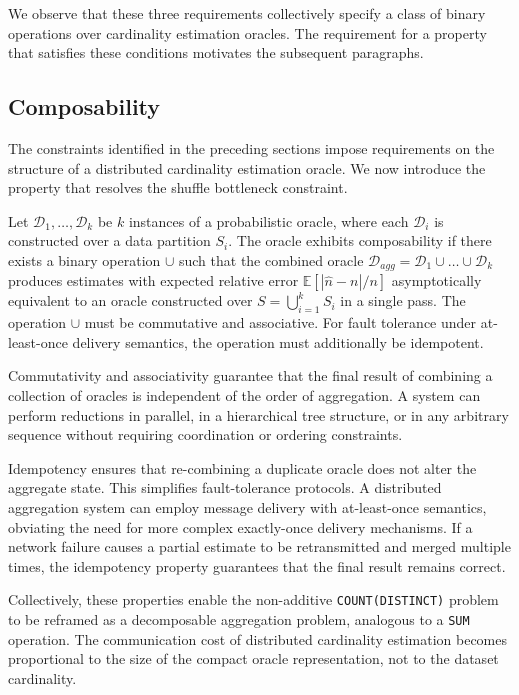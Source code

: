 We observe that these three requirements collectively specify a class of binary operations over cardinality estimation oracles. The requirement for a property that satisfies these conditions motivates the subsequent paragraphs.

\subsection{Composability}

The constraints identified in the preceding sections impose requirements on the structure of a distributed cardinality estimation oracle. We now introduce the property that resolves the shuffle bottleneck constraint.

\begin{definition}[Composability] \label{def:composability}
    Let $\mathcal{D}_1, \dots, \mathcal{D}_k$ be $k$ instances of a probabilistic oracle, where each $\mathcal{D}_i$ is constructed over a data partition $S_i$. The oracle exhibits composability if there exists a binary operation $\cup$ such that the combined oracle $\mathcal{D}_{agg} = \mathcal{D}_1 \cup \dots \cup \mathcal{D}_k$ produces estimates with expected relative error $\mathbb{E}[|\hat{n} - n|/n]$ asymptotically equivalent to an oracle constructed over $S = \bigcup_{i=1}^k S_i$ in a single pass. The operation $\cup$ must be commutative and associative. For fault tolerance under at-least-once delivery semantics, the operation must additionally be idempotent.
\end{definition}

Commutativity and associativity guarantee that the final result of combining a collection of oracles is independent of the order of aggregation. A system can perform reductions in parallel, in a hierarchical tree structure, or in any arbitrary sequence without requiring coordination or ordering constraints.

Idempotency ensures that re-combining a duplicate oracle does not alter the aggregate state. This simplifies fault-tolerance protocols. A distributed aggregation system can employ message delivery with at-least-once semantics, obviating the need for more complex exactly-once delivery mechanisms. If a network failure causes a partial estimate to be retransmitted and merged multiple times, the idempotency property guarantees that the final result remains correct.

Collectively, these properties enable the non-additive \texttt{COUNT(DISTINCT)} problem to be reframed as a decomposable aggregation problem, analogous to a \texttt{SUM} operation. The communication cost of distributed cardinality estimation becomes proportional to the size of the compact oracle representation, not to the dataset cardinality.

